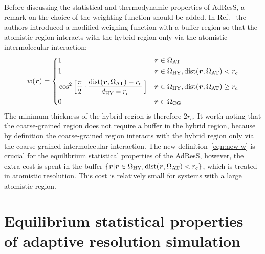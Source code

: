 \documentclass[epjST]{svjour}
\newcommand{\recheck}[1]{{\color{red} #1}}
\newcommand{\vect}[1]{\textbf{\textit{#1}}}
\newcommand{\dist}[0]{\textrm {dist}}
\newcommand{\AT}[0]{\textrm{AT}}
\newcommand{\HY}[0]{\textrm{HY}}
\newcommand{\CG}[0]{\textrm{CG}}
\begin{document}
Before discussing the statistical and thermodynamic properties of AdResS, a remark on the
choice of the weighting function should be added. 
In Ref.~\cite{wang2012adaptive} the authors introduced a modified weighing function with
a buffer region so that the atomistic region
interacts with the hybrid region only via the atomistic intermolecular interaction:
\begin{equation}\label{eqn:new-w}
  w(\vect r) =
  \left\{
    \begin{alignedat}{3}
      &1 &\quad& \vect r \in \Omega_\AT\\
      &1 && \vect r \in\Omega_\HY, \dist(\vect r, \Omega_\AT) < r_c \\
      &\cos^2\Big[\frac{\pi}{2 } \cdot \frac{\dist(\vect r, \Omega_\AT) - r_c}{d_{{\HY}} - r_c}\,\Big] && \vect r \in\Omega_\HY, \dist(\vect r, \Omega_\AT) \geq r_c\\
      &0 &    & \vect r \in \Omega_\CG 
    \end{alignedat}
  \right.
\end{equation}
The minimum thickness of the hybrid region is therefore $2r_c$.
It worth noting that the coarse-grained region does not require a buffer in the hybrid region, because
by definition the coarse-grained region interacts with the hybrid region only via the coarse-grained intermolecular interaction.
The new definition~\eqref{eqn:new-w} is crucial for the equilibrium statistical properties of the AdResS,
however, the extra cost is spent in the buffer $\{\vect r \vert \vect r \in\Omega_\HY, \dist(\vect r, \Omega_\AT) < r_c\}$,
which is treated in atomistic resolution. This cost is relatively small for systems with a large atomistic region.


\section{Equilibrium statistical properties of adaptive resolution simulation}
\label{sec:statistical}
\end{document}
